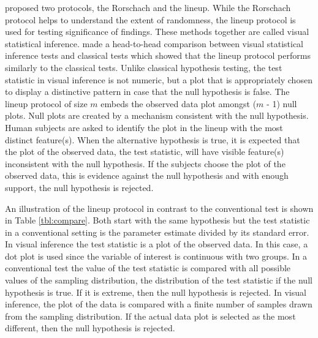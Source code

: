 \cite{buja:2009} proposed two protocols, the Rorschach and the lineup. While the Rorschach protocol helps to understand the extent of randomness, the lineup protocol is  used for testing significance of findings. These methods together are called visual statistical inference. \cite{majumder:2013} made a head-to-head comparison between visual statistical inference tests and classical tests which showed that the lineup protocol performs similarly to the classical tests. Unlike classical hypothesis testing, the test statistic in visual inference is not numeric, but a plot that is appropriately chosen to display a  distinctive pattern in case that the null hypothesis is false. The lineup protocol of size $m$ embeds the observed data plot amongst ($m$ - 1) null plots. Null plots are created by a mechanism consistent with the null hypothesis. Human subjects are asked to identify the plot in the lineup with the most distinct feature(s). When the alternative hypothesis is true, it is expected that the plot of the observed data, the test statistic, will have visible feature(s) inconsistent with the null hypothesis. If the subjects choose the plot of the observed data, this is evidence against the null hypothesis and with enough support, the null hypothesis is rejected. 

An illustration of the lineup protocol in contrast to the conventional test is shown in Table \ref{tbl:compare}. Both start with the same hypothesis but the test statistic in a conventional setting is the parameter estimate divided by its standard error. In visual inference the test statistic is a plot of the observed data. In this case, a dot plot is used since the variable of interest is continuous with two groups. In a conventional test the value of the test statistic is compared with all possible values of the sampling distribution, the distribution of the test statistic if the null hypothesis is true. If it is extreme, then the null hypothesis is rejected. In visual inference, the plot of the data is compared with a finite number of samples drawn from the sampling distribution. If the actual data plot is selected as the most different, then the null hypothesis is rejected. 


